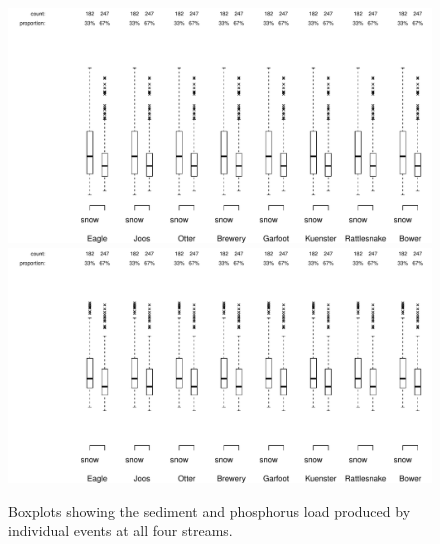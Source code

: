 \documentclass[10pt]{article}
\begin{document}
\begin{figure}[h]
    \begin{center}
\includegraphics{loadings-boxplot_stot}
    \vspace{15mm}
\includegraphics{loadings-boxplot_ptot}
    \caption{Boxplots showing the sediment and phosphorus load produced by individual events at all four streams.\label{boxplots}}
    \end{center}
\end{figure}










    
    
\end{document}
